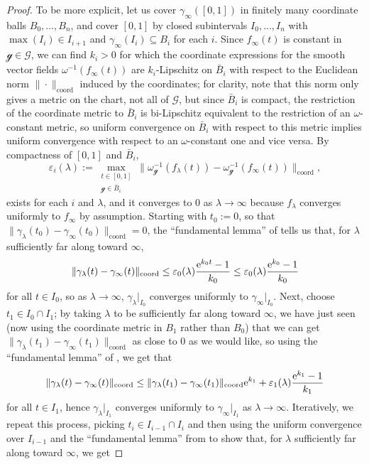 \documentclass[10pt,a4paper]{amsart}
\numberwithin{equation}{section}
\theoremstyle{definition}
\begin{document}
\begin{proof}
To be more explicit, let us cover $\gamma_\infty([0,1])$ in finitely many coordinate balls $B_0,\dots,B_n$, and cover $[0,1]$ by closed subintervals $I_0,\dots,I_n$ with $\max(I_i)\in I_{i+1}$ and $\gamma_\infty(I_i)\subseteq B_i$ for each $i$. Since $f_\infty(t)$ is constant in $\mathscr{g}\in\mathscr{G}$, we can find $k_i>0$ for which the coordinate expressions for the smooth vector fields $\omega^{-1}(f_\infty(t))$ are $k_i$-Lipschitz on $\bar{B}_i$ with respect to the Euclidean norm $\|\cdot\|_\text{coord}$ induced by the coordinates; for clarity, note that this norm only gives a metric on the chart, not all of $\mathscr{G}$, but since $\bar{B}_i$ is compact, the restriction of the coordinate metric to $\bar{B}_i$ is bi-Lipschitz equivalent to the restriction of an $\omega$-constant metric, %
so uniform convergence on $\bar{B}_i$ with respect to this metric implies uniform convergence with respect to an $\omega$-constant one and vice versa. By compactness of $[0,1]$ and $\bar{B}_i$,
\[\varepsilon_i(\lambda):=\max_{\substack{t\in[0,1] \\ \mathscr{g}\in\bar{B}_i}}\bigl\|\omega_\mathscr{g}^{-1}(f_\lambda(t))-\omega_\mathscr{g}^{-1}(f_\infty(t))\bigr\|_\text{coord},\]
exists for each $i$ and $\lambda$, and it converges to $0$ as $\lambda\rightarrow\infty$ because $f_\lambda$ converges uniformly to $f_\infty$ by assumption. Starting with $t_0:=0$, so that $\|\gamma_\lambda(t_0)-\gamma_\infty(t_0)\|_\text{coord}=0$, the ``fundamental lemma'' of \cite{HCartan1971} tells us that, for $\lambda$ sufficiently far along toward $\infty$,
\[\|\gamma_\lambda(t)-\gamma_\infty(t)\|_\text{coord}\leq\varepsilon_0(\lambda)\frac{{\rm e}^{k_0t}-1}{k_0}\leq\varepsilon_0(\lambda)\frac{{\rm e}^{k_0}-1}{k_0}\]
for all $t\in I_0$, so as $\lambda\rightarrow\infty$, $\gamma_\lambda|_{I_0}$ converges uniformly to $\gamma_\infty|_{I_0}$. Next, choose $t_1\in I_0\cap I_1$; by taking $\lambda$ to be sufficiently far along toward $\infty$, we have just seen (now using the coordinate metric in $B_1$ rather than $B_0$) that we can get $\|\gamma_\lambda(t_1)-\gamma_\infty(t_1)\|_\text{coord}$ as close to $0$ as we would like, so using the ``fundamental lemma'' of \cite{HCartan1971}, we get that
\[\|\gamma_\lambda(t)-\gamma_\infty(t)\|_\text{coord}\leq\|\gamma_\lambda(t_1)-\gamma_\infty(t_1)\|_\text{coord}{\rm e}^{k_1}+\varepsilon_1(\lambda)\frac{{\rm e}^{k_1}-1}{k_1}\]
for all $t\in I_1$, hence $\gamma_\lambda|_{I_1}$ converges uniformly to $\gamma_\infty|_{I_1}$ as $\lambda\rightarrow\infty$. Iteratively, we repeat this process, picking $t_i\in I_{i-1}\cap I_i$ and then using the uniform convergence over $I_{i-1}$ and the ``fundamental lemma'' from \cite{HCartan1971} to show that, for $\lambda$ sufficiently far along toward $\infty$, we get

\end{proof}
\end{document}
